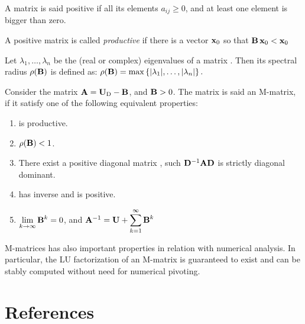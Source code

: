 \documentclass[preprint,12pt,times]{elsarticle}
\begin{document}
A matrix  is said positive if all its elements $a_{ij}\ge0$, and at least one element is bigger than zero. 

A positive matrix  is called \emph{productive} \cite{Smith:2013jd} if there is a vector $\mathbf{x}_0$ so that
$\mathbf{B}\,\mathbf{x}_0 < \mathbf{x}_0$

Let $\lambda _{1},\ldots ,\lambda _{n}$ be the (real or complex) eigenvalues of a matrix . Then its spectral radius $\rho(\mathbf{B})$ is defined as:
\(\displaystyle \rho (\mathbf{B})=\max \left\{|\lambda _{1}|,\ldots ,|\lambda _{n}|\right\}.\)

Consider the matrix $\mathbf{A}=\mathbf{U}_\mathrm{D}-\mathbf{B}$, and $\mathbf{B}>0$. The matrix  is said an M-matrix, if it satisfy one of the following equivalent properties:
\begin{enumerate}
	\item {} is productive.
	\item $\rho(\mathbf{B})<1$.
	\item There exist a positive diagonal matrix , such $\mathbf{D}^{-1}\mathbf{A}\mathbf{D}$ is strictly diagonal dominant.
	\item {} has inverse and  is positive.
	\item $\displaystyle{\lim_{k\rightarrow\infty}\ensuremath{\mathbf{B}}^k=0}$, and 
	$\mathbf{A}^{-1}=\mathbf{U}+\displaystyle{\sum_{k=1}^{\infty}{\ensuremath{\mathbf{B}}^{k}}}$	
\end{enumerate}	
M-matrices has also important properties in relation with numerical analysis. In particular, the LU factorization of an M-matrix is guaranteed to exist and can be stably computed without need for numerical pivoting. \cite{Smith:2012qr}

\section*{References}


\end{document}
